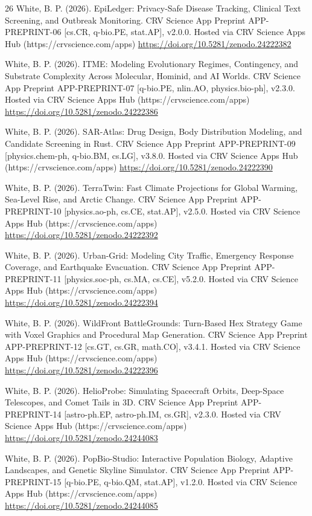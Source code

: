 \documentclass[10pt,letterpaper]{article}
\begin{document}
\begin{thebibliography}{26}
 White, B. P. (2026). EpiLedger: Privacy-Safe Disease Tracking, Clinical Text Screening, and Outbreak Monitoring. CRV Science App Preprint APP-PREPRINT-06 [cs.CR, q-bio.PE, stat.AP], v2.0.0. Hosted via CRV Science Apps Hub (https://crvscience.com/apps) \url{https://doi.org/10.5281/zenodo.24222382}

 White, B. P. (2026). ITME: Modeling Evolutionary Regimes, Contingency, and Substrate Complexity Across Molecular, Hominid, and AI Worlds. CRV Science App Preprint APP-PREPRINT-07 [q-bio.PE, nlin.AO, physics.bio-ph], v2.3.0. Hosted via CRV Science Apps Hub (https://crvscience.com/apps) \url{https://doi.org/10.5281/zenodo.24222386}

 White, B. P. (2026). SAR-Atlas: Drug Design, Body Distribution Modeling, and Candidate Screening in Rust. CRV Science App Preprint APP-PREPRINT-09 [physics.chem-ph, q-bio.BM, cs.LG], v3.8.0. Hosted via CRV Science Apps Hub (https://crvscience.com/apps) \url{https://doi.org/10.5281/zenodo.24222390}

 White, B. P. (2026). TerraTwin: Fast Climate Projections for Global Warming, Sea-Level Rise, and Arctic Change. CRV Science App Preprint APP-PREPRINT-10 [physics.ao-ph, cs.CE, stat.AP], v2.5.0. Hosted via CRV Science Apps Hub (https://crvscience.com/apps) \url{https://doi.org/10.5281/zenodo.24222392}

 White, B. P. (2026). Urban-Grid: Modeling City Traffic, Emergency Response Coverage, and Earthquake Evacuation. CRV Science App Preprint APP-PREPRINT-11 [physics.soc-ph, cs.MA, cs.CE], v5.2.0. Hosted via CRV Science Apps Hub (https://crvscience.com/apps) \url{https://doi.org/10.5281/zenodo.24222394}

 White, B. P. (2026). WildFront BattleGrounds: Turn-Based Hex Strategy Game with Voxel Graphics and Procedural Map Generation. CRV Science App Preprint APP-PREPRINT-12 [cs.GT, cs.GR, math.CO], v3.4.1. Hosted via CRV Science Apps Hub (https://crvscience.com/apps) \url{https://doi.org/10.5281/zenodo.24222396}

 White, B. P. (2026). HelioProbe: Simulating Spacecraft Orbits, Deep-Space Telescopes, and Comet Tails in 3D. CRV Science App Preprint APP-PREPRINT-14 [astro-ph.EP, astro-ph.IM, cs.GR], v2.3.0. Hosted via CRV Science Apps Hub (https://crvscience.com/apps) \url{https://doi.org/10.5281/zenodo.24244083}

 White, B. P. (2026). PopBio-Studio: Interactive Population Biology, Adaptive Landscapes, and Genetic Skyline Simulator. CRV Science App Preprint APP-PREPRINT-15 [q-bio.PE, q-bio.QM, stat.AP], v1.2.0. Hosted via CRV Science Apps Hub (https://crvscience.com/apps) \url{https://doi.org/10.5281/zenodo.24244085}


\end{thebibliography}
\end{document}
